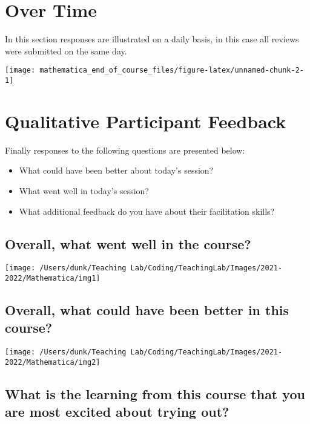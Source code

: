 \documentclass[10,a4paperpaper,]{article}
\begin{document}
\section{Over Time}

In this section responses are illustrated on a daily basis, in this case
all reviews were submitted on the same day.

\begin{center}\texttt{[image: mathematica\_end\_of\_course\_files/figure-latex/unnamed-chunk-2-1]} \end{center}

\section{Qualitative Participant Feedback}

Finally responses to the following questions are presented below:

\begin{itemize}
\item
  What could have been better about today's session?
\item
  What went well in today's session?
\item
  What additional feedback do you have about their facilitation skills?
\end{itemize}

\subsection{Overall, what went well in the course?}

\begin{center}\texttt{[image: /Users/dunk/Teaching Lab/Coding/TeachingLab/Images/2021-2022/Mathematica/img1]} \end{center}

\subsection{Overall, what could have been better in this course?}

\begin{center}\texttt{[image: /Users/dunk/Teaching Lab/Coding/TeachingLab/Images/2021-2022/Mathematica/img2]} \end{center}

\subsection{What is the learning from this course that you are most excited about trying out?}
\end{document}

